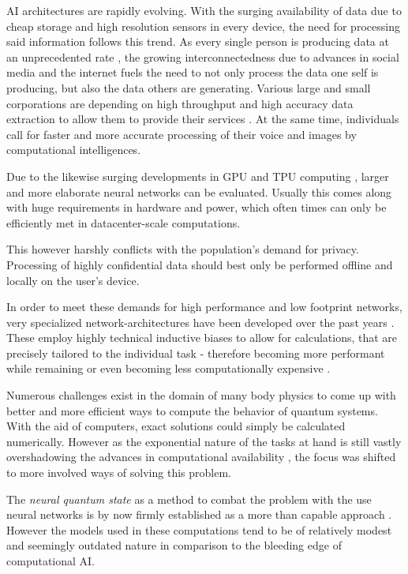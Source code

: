 AI architectures are rapidly evolving. With the surging availability of data due to cheap storage \cite[]{costDataStorage} and high resolution sensors in every device, the need for processing said information follows this trend.
As every single person is producing data at an unprecedented rate \cite[]{dataCreatedRate}, the growing interconnectedness due to advances in social media and the internet fuels the need to not only process the data one self is producing, but also the data others are generating.
Various large and small corporations are depending on high throughput and high accuracy data extraction to allow them to provide their services \cite{marketsizeArtificialIntelligence}.
At the same time, individuals call for faster and more accurate processing of their voice and images by computational intelligences. 

Due to the likewise surging developments in GPU and TPU computing \cite{gpuPerformanceOverTime}, larger and more elaborate neural networks can be evaluated.
Usually this comes along with huge requirements in hardware and power, which often times can only be efficiently met in datacenter-scale computations.

This however harshly conflicts with the population's demand for privacy. 
Processing of highly confidential data should best only be performed offline and locally on the user's device.

In order to meet these demands for high performance and low footprint networks, very specialized network-architectures have been developed over the past years \cite[]{attentionIsAllYouNeed, metaformerPaper}. 
These employ highly technical inductive biases to allow for calculations, that are precisely tailored to the individual task - therefore becoming more performant while remaining or even becoming less computationally expensive \cite{mobileNetPaper}.

Numerous challenges exist in the domain of many body physics to come up with better and more efficient ways to compute the behavior of quantum systems.
With the aid of computers, exact solutions could \glqq simply\grqq{} be calculated numerically.
However as the exponential nature of the tasks at hand is still vastly overshadowing the advances in computational availability \cite{quantumMonteCarloSimulationsOfSolids}, the focus was shifted to more involved ways of solving this problem.

The \emph{neural quantum state} as a method to combat the problem with the use neural networks is by now firmly established as a more than capable approach \cite{quantumMBPwithneuralNetworks}. However the models used in these computations tend to be of relatively modest and seemingly \glqq outdated\grqq{} nature in comparison to the bleeding edge of computational AI.

